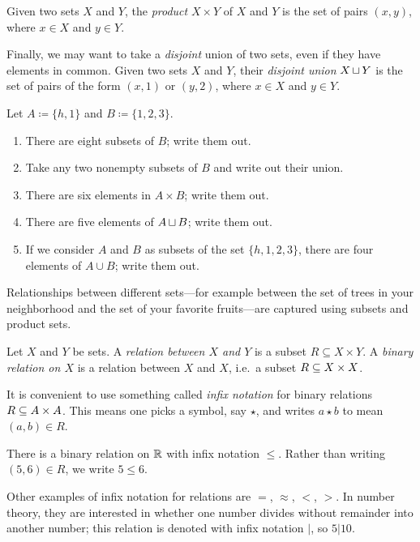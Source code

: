 \documentclass[7Sketches]{subfiles}
\begin{document}
Given two sets $X$ and $Y$, the \emph{product} $X \times Y$ of
$X$ and $Y$ is the set of pairs $(x,y)$, where $x \in X$ and $y \in Y$.%

Finally, we may want to take a \emph{disjoint} union of two sets, even if they
have elements in common. Given two sets $X$ and $Y$, their \emph{disjoint union}
$X \dju Y$ is the set of pairs of the form $(x,1)$ or $(y,2)$, where $x \in X$
and $y \in Y$.

\begin{exercise}%
\label{exc.subsets_products}
	Let $A\coloneqq\{h,1\}$ and $B\coloneqq\{1,2,3\}$.
	\begin{enumerate}
		\item There are eight subsets of $B$; write them out.
		\item Take any two nonempty subsets of $B$ and write out their union.
		\item There are six elements in $A\times B$; write them out.
	\qedhere
		\item There are five elements of $A \dju B$; write them out.
		\item If we consider $A$ and $B$ as subsets of the set
	$\{h,1,2,3\}$, there are four elements of $A \cup B$; write them out.
	\end{enumerate}
\end{exercise}
%

Relationships between different sets---for example between the set of trees in your neighborhood and the set of your favorite fruits---are captured using subsets and product sets.

\begin{definition}%
Let $X$ and $Y$ be sets. A \emph{relation between $X$ and $Y$} is a subset $R\subseteq X
\times Y$. A \emph{binary relation on $X$} is a relation between $X$ and $X$, i.e.\ a subset $R\ss X\times X$.%
%
\end{definition}

It is convenient to use something called \emph{infix notation} for binary relations $R\ss A\times A$. This means one picks a symbol, say $\star$, and writes $a\star b$ to mean $(a,b)\in R$.
%
%

\begin{example}%
There is a binary relation on $\RR$ with infix notation $\leq$. Rather than writing $(5,6)\in R$, we write $5\leq 6$.

Other examples of infix notation for relations are $=$, $\approx$, $<$, $>$. In number theory, they are interested in whether one number divides without remainder into another number; this relation is denoted with infix notation $|$, so $5|10$.
\end{example}%
%
\end{document}

